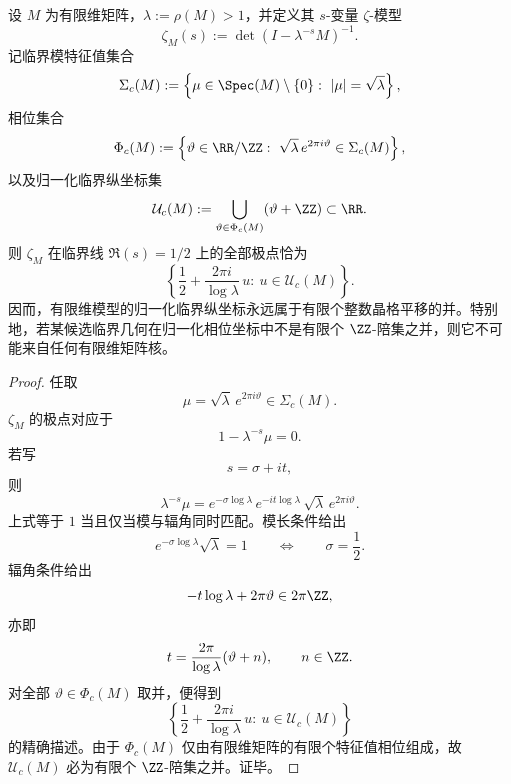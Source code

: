 \begin{theorem}\label{thm:conclusion-finite-dimensional-normalized-critical-phase-finite-comb}
设 \(M\) 为有限维矩阵，\(\lambda:=\rho(M)>1\)，并定义其 \(s\)-变量 \(\zeta\)-模型
\[
\zeta_M(s):=\det(I-\lambda^{-s}M)^{-1}.
\]
记临界模特征值集合
\[
\Sigma_c(M):=
\left\{
\mu\in \Spec(M)\setminus\{0\}:\ |\mu|=\sqrt{\lambda}
\right\},
\]
相位集合
\[
\Phi_c(M):=
\left\{
\vartheta\in \RR/\ZZ:\ \sqrt{\lambda}\,e^{2\pi i\vartheta}\in \Sigma_c(M)
\right\},
\]
以及归一化临界纵坐标集
\[
\mathcal U_c(M):=
\bigcup_{\vartheta\in\Phi_c(M)}(\vartheta+\ZZ)\subset \RR.
\]
则 \(\zeta_M\) 在临界线 \(\Re(s)=1/2\) 上的全部极点恰为
\[
\left\{
\frac12+\frac{2\pi i}{\log\lambda}\,u:\ u\in\mathcal U_c(M)
\right\}.
\]
因而，有限维模型的归一化临界纵坐标永远属于有限个整数晶格平移的并。特别地，若某候选临界几何在归一化相位坐标中不是有限个 \(\ZZ\)-陪集之并，则它不可能来自任何有限维矩阵核。
\end{theorem}
\begin{proof}
任取
\[
\mu=\sqrt{\lambda}\,e^{2\pi i\vartheta}\in \Sigma_c(M).
\]
\(\zeta_M\) 的极点对应于
\[
1-\lambda^{-s}\mu=0.
\]
若写
\[
s=\sigma+it,
\]
则
\[
\lambda^{-s}\mu
=
e^{-\sigma\log\lambda}\,e^{-it\log\lambda}\,\sqrt{\lambda}\,e^{2\pi i\vartheta}.
\]
上式等于 \(1\) 当且仅当模与辐角同时匹配。模长条件给出
\[
e^{-\sigma\log\lambda}\sqrt{\lambda}=1
\qquad\Longleftrightarrow\qquad
\sigma=\frac12.
\]
辐角条件给出
\[
-t\log\lambda+2\pi\vartheta\in 2\pi\ZZ,
\]
亦即
\[
t=\frac{2\pi}{\log\lambda}(\vartheta+n),
\qquad n\in\ZZ.
\]
对全部 \(\vartheta\in \Phi_c(M)\) 取并，便得到
\[
\left\{
\frac12+\frac{2\pi i}{\log\lambda}\,u:\ u\in\mathcal U_c(M)
\right\}
\]
的精确描述。由于 \(\Phi_c(M)\) 仅由有限维矩阵的有限个特征值相位组成，故 \(\mathcal U_c(M)\) 必为有限个 \(\ZZ\)-陪集之并。证毕。
\end{proof}

